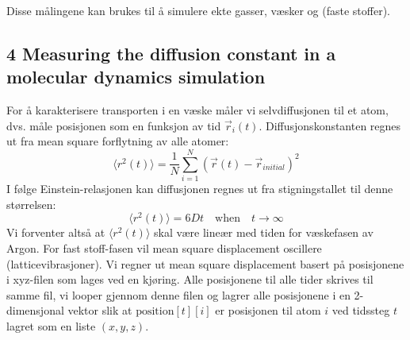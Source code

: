 \documentclass[english, a4paper]{article}
\begin{document}
\noindent
Disse målingene kan brukes til å simulere ekte gasser, væsker og (faste stoffer). 


\subsection{4 Measuring the diffusion constant in a molecular dynamics simulation}

For å karakterisere transporten i en væske måler vi selvdiffusjonen til et atom, 
dvs. måle posisjonen som en funksjon av tid $\vec{r}_i(t)$. Diffusjonskonstanten
regnes ut fra mean square forflytning av alle atomer:
\begin{equation}
 \langle r^2(t) \rangle = \frac{1}{N}\sum_{i=1}^N (\vec{r}(t) - \vec{r}_{initial})^2
\end{equation}
I følge Einstein-relasjonen kan diffusjonen regnes ut fra stigningstallet til denne størrelsen:
\begin{equation}
 \langle r^2(t) \rangle = 6Dt \quad \textrm{when} \quad t \rightarrow \infty
\end{equation}
Vi forventer altså at $\langle r^2(t) \rangle$ skal være lineær med tiden for væskefasen av Argon.
For fast stoff-fasen vil mean square displacement oscillere (latticevibrasjoner).
Vi regner ut mean square displacement basert på posisjonene i xyz-filen som lages ved en kjøring.
Alle posisjonene til alle tider skrives til samme fil, vi looper gjennom denne filen og lagrer alle posisjonene i 
en 2-dimensjonal vektor slik at $\textrm{position}[t][i]$ er posisjonen til atom $i$ ved tidssteg $t$ lagret
som en liste $(x,y,z)$. \\
\end{document}
